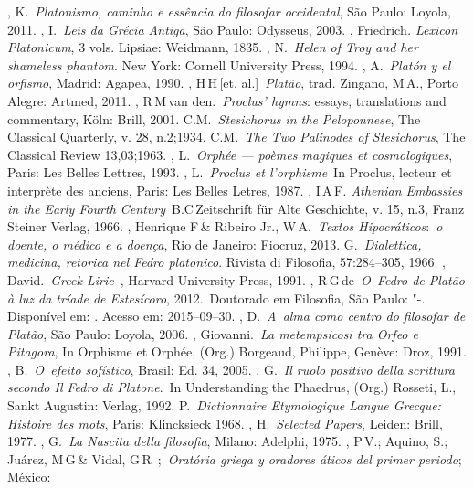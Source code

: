 \begin{bibliohedra}
, K.~\emph{Platonismo, caminho e essência do filosofar
  occidental}, São Paulo: Loyola, 2011.
, I.~\emph{Leis da Grécia Antiga}, São Paulo: Odysseus,
  2003.
, Friedrich\emph{. Lexicon Platonicum}, 3 vols. Lipsiae: Weidmann,
  1835.
, N.~\emph{Helen of Troy and her shameless phantom}. New York:
  Cornell University Press, 1994.
, A.~\emph{Platón y el orfismo}, Madrid: Agapea, 1990.
, H\,H\,[et. al.]~\emph{Platão}, trad. Zingano, M\,A., Porto
  Alegre: Artmed, 2011.
, R\,M\,van den.~\emph{Proclus' hymns}: essays, translations and
  commentary, Köln: Brill, 2001.
 C.M.~\emph{Stesichorus in the Peloponnese}, The Classical
  Quarterly, v. 28, n.2;1934.
 C.M.~\emph{The Two Palinodes of Stesichorus}, The Classical
  Review 13,03;1963.
, L.~\emph{Orphée --- poèmes magiques et cosmologiques}, Paris:
  Les Belles Lettres, 1993.
, L.~\emph{Proclus et l'orphisme}~In Proclus, lecteur et
  interprète des anciens, Paris: Les Belles Letres, 1987.
, I\,A\,F\emph{. Athenian Embassies in the Early Fourth
  Century}~B.C\,Zeitschrift für Alte Geschichte, v. 15, n.3, Franz
  Steiner Verlag, 1966.
, Henrique F\,\& Ribeiro Jr., W\,A.~\emph{Textos
  Hipocráticos}:~\emph{o doente, o médico e a doença}, Rio de Janeiro:
  Fiocruz, 2013.
 G.~\emph{Dialettica, medicina, retorica nel Fedro platonico}.
  Rivista di Filosofia, 57:284--305, 1966.
, David.~\emph{Greek Liric}~, Harvard University Press,
  1991.
, R\,G\,de~\emph{O~Fedro de Platão à luz da tríade de
  Estesícoro}, 2012.~Doutorado em Filosofia, São Paulo: "-.
  Disponível em: . Acesso em: 2015--09--30.
, D.~\emph{A~alma como centro do filosofar de Platão}, São
  Paulo: Loyola, 2006.
, Giovanni.~\emph{La metempsicosi tra Orfeo e Pitagora}, In
  Orphisme et Orphée, (Org.) Borgeaud, Philippe, Genève: Droz, 1991.
, B.~\emph{O~efeito sofístico}, Brasil: Ed. 34, 2005.
, G.~\emph{Il ruolo positivo della scrittura secondo Il Fedro di
  Platone}.~In Understanding the Phaedrus, (Org.) Rosseti, L., Sankt
  Augustin: Verlag, 1992.
 P.~\emph{Dictionnaire Etymologique Langue Grecque: Histoire
  des mots}, Paris: Klincksieck 1968.
, H.~\emph{Selected Papers}, Leiden: Brill, 1977.
, G.~\emph{La Nascita della filosofia}, Milano: Adelphi, 1975.
, P\,V.; Aquino, S.; Juárez, M\,G\,\& Vidal, G\,R\,  ;~\emph{Oratória griega y oradores áticos del primer periodo}; México:

\end{bibliohedra}
